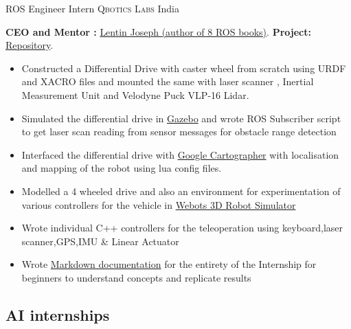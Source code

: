 \documentclass[11pt,a4paper,sans]{moderncv} %
\begin{document}
{ROS Engineer Intern}
{\textsc{Qbotics Labs}}
{India}
{}
{
\textbf{ CEO and Mentor :} \href{https://in.linkedin.com/in/lentinjoseph}{Lentin Joseph (author of 8 ROS books)}.
\textbf{ Project:} \href{https://github.com/teetangh/Qbotics-Labs-Internship-Differential-Drives}{Repository}.
\begin{itemize}
    \item{Constructed a Differential Drive with caster wheel from scratch using URDF and XACRO files and mounted the same with laser scanner , Inertial Measurement Unit and Velodyne Puck VLP-16 Lidar. }
    \item{Simulated the differential drive in \underline{Gazebo} and wrote ROS Subscriber script to get laser scan reading from sensor messages for obstacle range detection }
    \item{Interfaced the differential drive with \underline{Google Cartographer} with localisation and mapping of the robot using lua config files. }
    \item{Modelled a 4 wheeled drive and also an environment for experimentation of various controllers for the vehicle in \underline{Webots 3D Robot Simulator}}
    \item{Wrote individual C++ controllers for the teleoperation using keyboard,laser scanner,GPS,IMU \& Linear Actuator}
    \item{Wrote \underline{Markdown documentation} for the entirety of the Internship for beginners to understand concepts and replicate results}
\end{itemize}
}

\subsection{AI internships}
\end{document}
